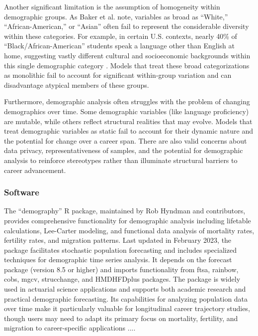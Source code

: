 \documentclass[../main.tex]{subfiles}
\begin{document}
Another significant limitation is the assumption of homogeneity within demographic groups. As Baker et al. note, variables as broad as ``White,'' ``African-American,'' or ``Asian'' often fail to represent the considerable diversity within these categories. For example, in certain U.S. contexts, nearly 40\% of ``Black/African-American'' students speak a language other than English at home, suggesting vastly different cultural and socioeconomic backgrounds within this single demographic category \citep{baker2023demographic}. Models that treat these broad categorizations as monolithic fail to account for significant within-group variation and can disadvantage atypical members of these groups.

Furthermore, demographic analysis often struggles with the problem of changing demographics over time. Some demographic variables (like language proficiency) are mutable, while others reflect structural realities that may evolve. Models that treat demographic variables as static fail to account for their dynamic nature and the potential for change over a career span. There are also valid concerns about data privacy, representativeness of samples, and the potential for demographic analysis to reinforce stereotypes rather than illuminate structural barriers to career advancement.

\subsubsection{Software}


The ``demography'' R package, maintained by Rob Hyndman and contributors, provides comprehensive functionality for demographic analysis including lifetable calculations, Lee-Carter modeling, and functional data analysis of mortality rates, fertility rates, and migration patterns. Last updated in February 2023, the package facilitates stochastic population forecasting and includes specialized techniques for demographic time series analysis. It depends on the forecast package (version 8.5 or higher) and imports functionality from ftsa, rainbow, cobs, mgcv, strucchange, and HMDHFDplus packages. The package is widely used in actuarial science applications and supports both academic research and practical demographic forecasting. Its capabilities for analyzing population data over time make it particularly valuable for longitudinal career trajectory studies, though users may need to adapt its primary focus on mortality, fertility, and migration to career-specific applications \citep{hyndman2023demography}.... 
\end{document}
